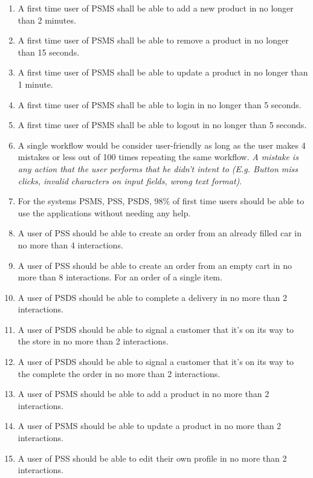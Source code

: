 \begin{enumerate}[label=USE-\arabic*]
    \item A first time user of PSMS shall be able to add a new product in 
    no longer than 2 minutes.
    \item A first time user of PSMS shall be able to remove a product in 
    no longer than 15 seconds.
    \item A first time user of PSMS shall be able to update a product in 
    no longer than 1 minute.
    \item A first time user of PSMS shall be able to login in no longer 
    than 5 seconds.
    \item A first time user of PSMS shall be able to logout in no longer 
    than 5 seconds.
    \item A single workflow would be consider user-friendly as long as the 
    user makes 4 mistakes or less out of 100 times repeating the same workflow. 
    \textit{A mistake is any action that the user performs that he didn’t 
    intent to (E.g. Button miss clicks, invalid characters on input fields, 
    wrong text format)}.
    \item For the systems PSMS, PSS, PSDS, 98\% of first time users should be 
    able to use the applications without needing any help.
    \item A user of PSS should be able to create an order from an already 
    filled car in no more than 4 interactions.
    \item A user of PSS should be able to create an order from an empty cart 
    in no more than 8 interactions. For an order of a single item.
    \item A user of PSDS should be able to complete a delivery in no more 
    than 2 interactions.
    \item A user of PSDS should be able to signal a customer that it’s on its 
    way to the store in no more than 2 interactions.
    \item A user of PSDS should be able to signal a customer that it’s on its
    way to the complete the order in no more than 2 interactions.
    \item A user of PSMS should be able to add a product in no more 
    than 2 interactions.
    \item A user of PSMS should be able to update a product in no more 
    than 2 interactions.
    \item A user of PSS should be able to edit their own profile in no more 
    than 2 interactions.
    
\end{enumerate}

